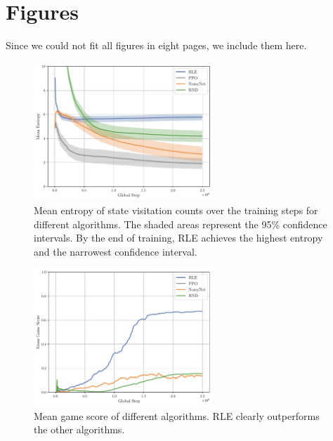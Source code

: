 \appendix

\section{Figures}
Since we could not fit all figures in eight pages, we include them here.

\begin{figure}[h!]
  \centering
  \includegraphics[width=0.6\textwidth]{figures/gridworld_mean_entropy_state_visitation_algorithms.pdf}
  \caption{Mean entropy of state visitation counts over the training steps for different algorithms. The shaded areas represent the 95\% confidence intervals. By the end of training, RLE achieves the highest entropy and the narrowest confidence interval.}
  \label{fig:gridworld-entropy-algorithms}
\end{figure}

\begin{figure}[h!]
  \centering
  \includegraphics[width=0.6\textwidth]{figures/gridworld_mean_game_score_algorithms.pdf}
  \caption{Mean game score of different algorithms. RLE clearly outperforms the other algorithms.}
  \label{fig:gridworld-score-algorithms}
\end{figure}

